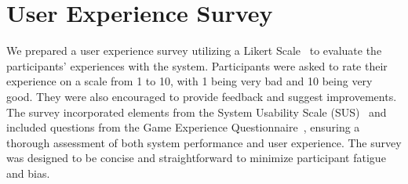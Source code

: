 \section{User Experience Survey}
We prepared a user experience survey utilizing a Likert Scale~\cite{likert1932technique} to evaluate the participants' experiences with the system. 
Participants were asked to rate their experience on a scale from 1 to 10, with 1 being very bad and 10 being very good. 
They were also encouraged to provide feedback and suggest improvements. 
The survey incorporated elements from the System Usability Scale (SUS)~\cite{brooke1996sus} and included questions from the Game Experience Questionnaire~\cite{ijsselsteijn2013game}, ensuring a thorough assessment of both system performance and user experience. 
The survey was designed to be concise and straightforward to minimize participant fatigue and bias.


